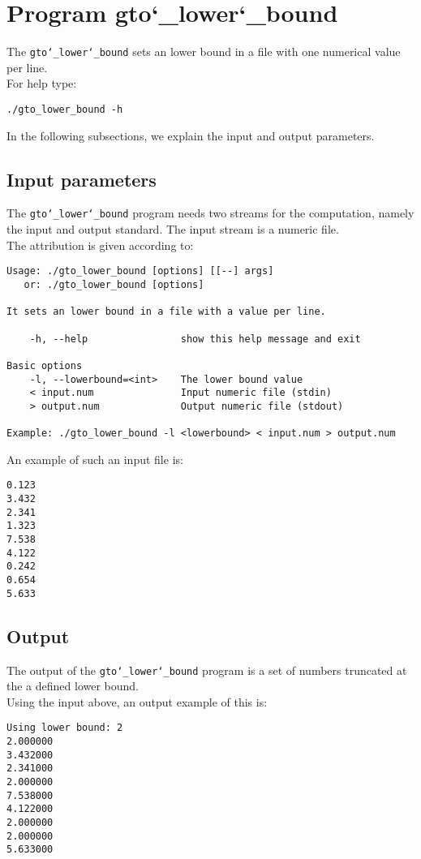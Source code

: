 \section{Program gto\char`_lower\char`_bound}
The \texttt{gto\char`_lower\char`_bound} sets an lower bound in a file with one numerical value per line.\\
For help type:
\begin{lstlisting}
./gto_lower_bound -h
\end{lstlisting}
In the following subsections, we explain the input and output parameters.

\subsection*{Input parameters}

The \texttt{gto\char`_lower\char`_bound} program needs two streams for the computation, namely the input and output standard. The input stream is a numeric file.\\
The attribution is given according to:
\begin{lstlisting}
Usage: ./gto_lower_bound [options] [[--] args]
   or: ./gto_lower_bound [options]

It sets an lower bound in a file with a value per line.

    -h, --help                show this help message and exit

Basic options
    -l, --lowerbound=<int>    The lower bound value
    < input.num               Input numeric file (stdin)
    > output.num              Output numeric file (stdout)

Example: ./gto_lower_bound -l <lowerbound> < input.num > output.num
\end{lstlisting}
An example of such an input file is:
\begin{lstlisting}
0.123
3.432
2.341
1.323
7.538
4.122
0.242
0.654
5.633
\end{lstlisting}

\subsection*{Output}
The output of the \texttt{gto\char`_lower\char`_bound} program is a set of numbers truncated at the a defined lower bound.\\
Using the input above, an output example of this is:
\begin{lstlisting}
Using lower bound: 2
2.000000
3.432000
2.341000
2.000000
7.538000
4.122000
2.000000
2.000000
5.633000
\end{lstlisting}